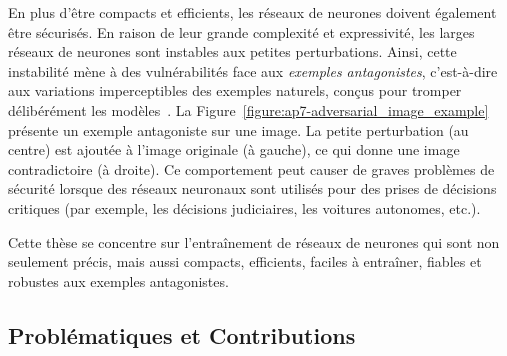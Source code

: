 En plus d'être compacts et efficients, les réseaux de neurones doivent également être sécurisés.
En raison de leur grande complexité et expressivité, les larges réseaux de neurones sont instables aux petites perturbations.
Ainsi, cette instabilité mène à des vulnérabilités face aux \emph{exemples antagonistes}, c'est-à-dire aux variations imperceptibles des exemples naturels, conçus pour tromper délibérément les modèles~\cite{globerson2006nightmare,biggio2013evasion,szegedy2013intriguing}.
La Figure~\ref{figure:ap7-adversarial_image_example} présente un exemple antagoniste sur une image.
La petite perturbation (au centre) est ajoutée à l'image originale (à gauche), ce qui donne une image contradictoire (à droite).
Ce comportement peut causer de graves problèmes de sécurité lorsque des réseaux neuronaux sont utilisés pour des prises de décisions critiques (par exemple, les décisions judiciaires, les voitures autonomes, etc.).



Cette thèse se concentre sur l'entraînement de réseaux de neurones qui sont non seulement précis, mais aussi compacts, efficients, faciles à entraîner, fiables et robustes aux exemples antagonistes.




\subsection{Problématiques et Contributions}
\label{subsection:ap7-problem_statement_and_contributions}




